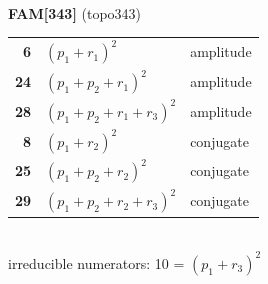 \documentclass[10pt]{article}
\begin{document}
\begin{minipage}[t]{0.48\textwidth}
{}\\[2mm]\textbf{FAM[343]} (topo343)\\[2pt]{\footnotesize\begin{tabular}{@{}r@{\ \ }l@{\ \ }l@{}}\textbf{6} & $(p_1+r_1)^2$ & amplitude\\
\textbf{24} & $(p_1+p_2+r_1)^2$ & amplitude\\
\textbf{28} & $(p_1+p_2+r_1+r_3)^2$ & amplitude\\
\textbf{8} & $(p_1+r_2)^2$ & conjugate\\
\textbf{25} & $(p_1+p_2+r_2)^2$ & conjugate\\
\textbf{29} & $(p_1+p_2+r_2+r_3)^2$ & conjugate\\\end{tabular}}\\[2pt]{\scriptsize irreducible numerators: 10 = $(p_1+r_3)^2$}\end{minipage}\hfill%
\end{document}
